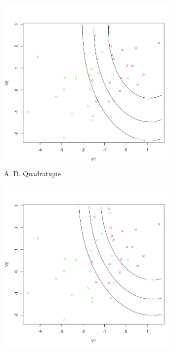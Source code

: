 \documentclass[a4paper,10pt]{report}
\begin{document}
\begin{figure}[H]
	\centering
	\captionsetup{justification=centering, margin=2cm}
	\begin{subfigure}[b]{0.5\linewidth}
		\centering
		\captionsetup{justification=centering, margin=1cm}
		\includegraphics[width=1\linewidth]{img/1-3-verif-adq}
		\caption{\small A. D. Quadratique}
	\end{subfigure}%
	\begin{subfigure}[b]{0.5\linewidth}
		\centering
		\captionsetup{justification=centering, margin=1cm}
		\includegraphics[width=1\linewidth]{img/1-3-verif-nba}

\end{subfigure}
\end{figure}
\end{document}
